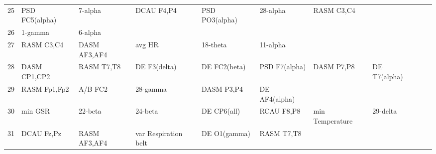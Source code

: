 \begin{landscape}
\begin{table}[]
\begin{tabular}{l|llllllll}
25       & PSD FC5(alpha)        & 7-alpha               & DCAU F4,P4           & PSD PO3(alpha)          & 28-alpha                & RASM C3,C4           &                      &                       &                       &                    \\
26       & 1-gamma               & 6-alpha               &                      &                         &                         &                      &                      &                       &                       &                    \\
27       & RASM C3,C4            & DASM AF3,AF4          & avg HR               & 18-theta                & 11-alpha                &                      &                      &                       &                       &                    \\
28       & DASM CP1,CP2          & RASM T7,T8            & DE F3(delta)         & DE FC2(beta)            & PSD F7(alpha)           & DASM P7,P8           & DE T7(alpha)         &                       &                       &                    \\
29       & RASM Fp1,Fp2          & A/B FC2               & 28-gamma             & DASM P3,P4              & DE AF4(alpha)           &                      &                      &                       &                       &                    \\
30       & min GSR               & 22-beta               & 24-beta              & DE CP6(all)             & RCAU F8,P8              & min Temperature      & 29-delta             &                       &                       &                    \\
31       & DCAU Fz,Pz            & RASM AF3,AF4          & var Respiration belt & DE O1(gamma)            & RASM T7,T8              &                      &                      &                       &                       &                    \\
\end{tabular}
\end{table}
\end{landscape}
\clearpage
